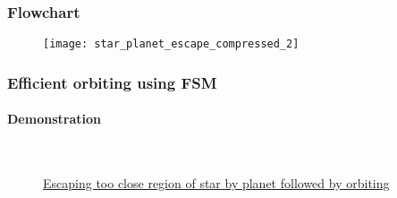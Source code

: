 \begin{frame}
\frametitle{Flowchart}
\begin{figure}[H]
	\centering
	\texttt{[image: star\_planet\_escape\_compressed\_2]}
\end{figure}
\end{frame}

\begin{frame}
\frametitle{Efficient orbiting using FSM}
\framesubtitle{Demonstration}
\begin{figure}[H]
	\begin{center}
	\\
	\vspace{0.2cm}
	\caption{\href{https://youtu.be/X6dGCLT0ho8}{Escaping too close region of star by planet followed by orbiting}}
	\label{fig:shape_formation_demo}
	\end{center}
\end{figure}
\end{frame}